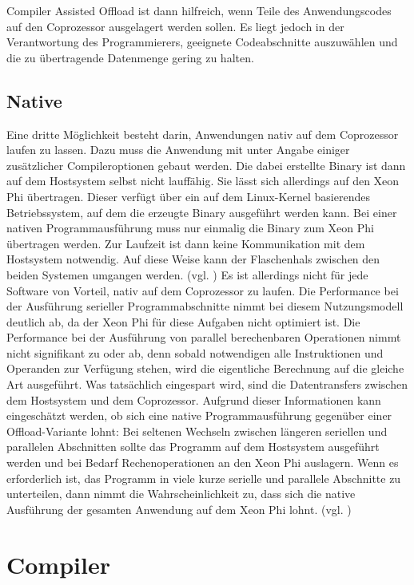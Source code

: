 \documentclass[../main.tex]{subfiles}
\begin{document}
Compiler Assisted Offload ist dann hilfreich, wenn Teile des Anwendungscodes auf den Coprozessor ausgelagert werden sollen. Es liegt jedoch in der Verantwortung des Programmierers, geeignete Codeabschnitte auszuwählen und die zu übertragende Datenmenge gering zu halten. 
\subsection{Native}
Eine dritte Möglichkeit besteht darin, Anwendungen nativ auf dem Coprozessor laufen zu lassen. Dazu muss die Anwendung mit unter Angabe einiger zusätzlicher Compileroptionen gebaut werden. Die dabei erstellte Binary ist dann auf dem Hostsystem selbst nicht lauffähig. Sie lässt sich allerdings auf den Xeon Phi übertragen. Dieser verfügt über ein auf dem Linux-Kernel basierendes Betriebssystem, auf dem die erzeugte Binary ausgeführt werden kann. Bei einer nativen Programmausführung muss nur einmalig die Binary zum Xeon Phi übertragen werden. Zur Laufzeit ist dann keine Kommunikation mit dem Hostsystem notwendig. Auf diese Weise kann der Flaschenhals zwischen den beiden Systemen umgangen werden. (vgl. \cite{xeonphiQuickstart})
Es ist allerdings nicht für jede Software von Vorteil, nativ auf dem Coprozessor zu laufen. Die Performance bei der Ausführung serieller Programmabschnitte nimmt bei diesem Nutzungsmodell deutlich ab, da der Xeon Phi für diese Aufgaben nicht optimiert ist. Die Performance bei der Ausführung von parallel berechenbaren Operationen nimmt nicht signifikant zu oder ab, denn sobald notwendigen alle Instruktionen und Operanden zur Verfügung stehen, wird die eigentliche Berechnung auf die gleiche Art ausgeführt. Was tatsächlich eingespart wird, sind die Datentransfers zwischen dem Hostsystem und dem Coprozessor. Aufgrund dieser Informationen kann eingeschätzt werden, ob sich eine native Programmausführung gegenüber einer Offload-Variante lohnt: Bei seltenen Wechseln zwischen längeren seriellen und parallelen Abschnitten sollte das Programm auf dem Hostsystem ausgeführt werden und bei Bedarf Rechenoperationen an den Xeon Phi auslagern. Wenn es erforderlich ist, das Programm in viele kurze serielle und parallele Abschnitte zu unterteilen, dann nimmt die Wahrscheinlichkeit zu, dass sich die native Ausführung der gesamten Anwendung auf dem Xeon Phi lohnt. (vgl. \cite{xeonphiQuickstart})
\section{Compiler}
\end{document}
